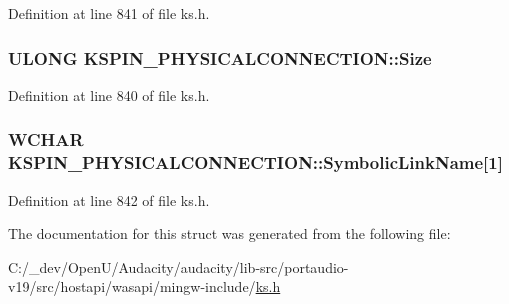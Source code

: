 Definition at line 841 of file ks.\+h.

\subsubsection[{\texorpdfstring{Size}{Size}}]{\setlength{\rightskip}{0pt plus 5cm}U\+L\+O\+NG K\+S\+P\+I\+N\+\_\+\+P\+H\+Y\+S\+I\+C\+A\+L\+C\+O\+N\+N\+E\+C\+T\+I\+O\+N\+::\+Size}\hypertarget{struct_k_s_p_i_n___p_h_y_s_i_c_a_l_c_o_n_n_e_c_t_i_o_n_a4108d9b16615bd5d9beedaa8974c49a8}{}\label{struct_k_s_p_i_n___p_h_y_s_i_c_a_l_c_o_n_n_e_c_t_i_o_n_a4108d9b16615bd5d9beedaa8974c49a8}


Definition at line 840 of file ks.\+h.

\subsubsection[{\texorpdfstring{Symbolic\+Link\+Name}{SymbolicLinkName}}]{\setlength{\rightskip}{0pt plus 5cm}W\+C\+H\+AR K\+S\+P\+I\+N\+\_\+\+P\+H\+Y\+S\+I\+C\+A\+L\+C\+O\+N\+N\+E\+C\+T\+I\+O\+N\+::\+Symbolic\+Link\+Name\mbox{[}1\mbox{]}}\hypertarget{struct_k_s_p_i_n___p_h_y_s_i_c_a_l_c_o_n_n_e_c_t_i_o_n_abfc0094a85674a0a8d6bfd943b83cbb7}{}\label{struct_k_s_p_i_n___p_h_y_s_i_c_a_l_c_o_n_n_e_c_t_i_o_n_abfc0094a85674a0a8d6bfd943b83cbb7}


Definition at line 842 of file ks.\+h.



The documentation for this struct was generated from the following file\+:\begin{DoxyCompactItemize}
\item 
C\+:/\+\_\+dev/\+Open\+U/\+Audacity/audacity/lib-\/src/portaudio-\/v19/src/hostapi/wasapi/mingw-\/include/\hyperlink{ks_8h}{ks.\+h}\end{DoxyCompactItemize}

